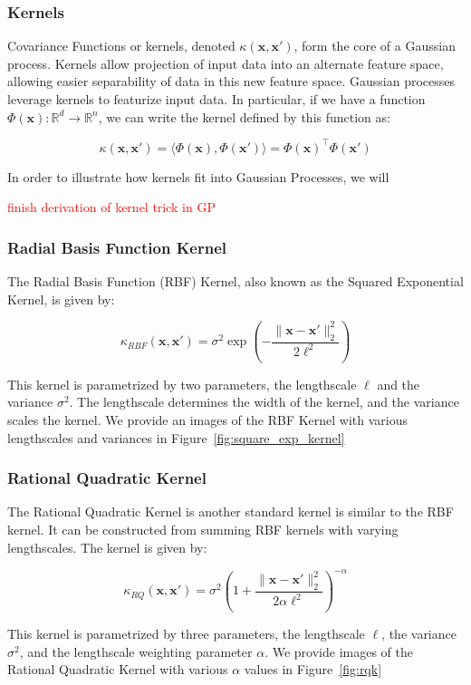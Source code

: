 \documentclass[pdf]{beamer}
\newcommand{\R}{\mathbb{R}}
\newcommand{\bx}{\boldsymbol{x}}
\newcommand{\todo}[1]{\textcolor{red}{#1}}
\begin{document}
\begin{frame}\label{slide:kernels}
  \frametitle{Kernels}

Covariance Functions or kernels, denoted $\kappa(\bx, \bx')$, form the core of a Gaussian process. Kernels allow
projection of input data into an alternate feature space, allowing easier separability of data in this new feature
space. Gaussian processes leverage kernels to featurize input data. In particular, if we have a function
$\Phi(\bx): \R^d \rightarrow \R^n$, we can write the kernel defined by this function as:

\[
  \kappa(\bx, \bx') = \langle \Phi(\bx), \Phi(\bx') \rangle = \Phi(\bx)^\top \Phi(\bx')
\]

In order to illustrate how kernels fit into Gaussian Processes, we will 

\todo{finish derivation of kernel trick in GP}

\end{frame}

\begin{frame}
  \frametitle{Radial Basis Function Kernel}

The Radial Basis Function (RBF) Kernel, also known as the Squared Exponential Kernel, is given by:

\[
  \kappa_{RBF}(\bx, \bx') = \sigma^2 \exp\left( - \frac{\|\bx -\bx' \|_{2}^{2}}{2 \ell^2} \right)
\]

This kernel is parametrized by two parameters, the lengthscale $\ell$ and the variance $\sigma^2$. The lengthscale
determines the width of the kernel, and the variance scales the kernel\cite{duvenaud_automatic_2014}. We provide an
images of the RBF Kernel with various lengthscales and variances in Figure~\ref{fig:square_exp_kernel}

\end{frame}

\begin{frame}
  \frametitle{Rational Quadratic Kernel}

The Rational Quadratic Kernel is another standard kernel is similar to the RBF kernel. It can be constructed from
summing RBF kernels with varying lengthscales. The kernel is given by:

\[
  \kappa_{RQ}(\bx, \bx') = \sigma^2 \left( 1 + \frac{\| \bx - \bx' \|_{2}^{2}}{2 \alpha \ell^2} \right)^{-\alpha}
\]

This kernel is parametrized by three parameters, the lengthscale $\ell$, the variance $\sigma^2$, and the lengthscale
weighting parameter $\alpha$\cite{duvenaud_automatic_2014}. We provide images of the Rational Quadratic Kernel with
various $\alpha$ values in Figure~\ref{fig:rqk}
\end{frame}
\end{document}
